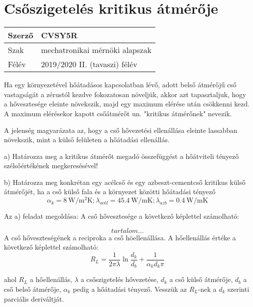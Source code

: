 
\section*{Csőszigetelés kritikus átmérője}


\begin{tabular}{ | p{2cm} | p{14cm} | } 
	\hline
	Szerző & CVSY5R \\ 
	\hline
	Szak & mechatronikai mérnöki alapszak \\ 
	\hline
	Félév & 2019/2020 II. (tavaszi) félév \\ 
	\hline
\end{tabular}
\vspace{0.5cm}

\noindent Ha egy környezetével hőátadásos kapcsolatban lévő, adott belső átmérőjű cső vastagságát a zérustól kezdve fokozatosan növeljük, akkor azt tapasztaljuk, hogy a hővesztesége eleinte növekszik, majd egy maximum elérése után csökkenni kezd. A maximum elérésekor kapott csőátmérőt un. "kritikus átmérőnek" nevezik.

A jelenség magyarázata az, hogy a cső hővezetési ellenállása eleinte lassabban növekszik, mint a külső felületen a hőátadási ellenállás.

a) Határozza meg a kritikus átmérőt megadó összefüggést a hőátviteli tényező szélsőértékének megkeresésével!

b) Határozza meg konkrétan egy acélcső és egy azbeszt-cementcső kritikus külső átmérőjét, ha a cső külső fala és a környezet közötti hőátadási tényező 
\[\alpha_k = \SI{8}{\watt\per\meter\squared\kelvin}; \lambda_{\textit{acél}} = \SI{45,4}{\watt\per\meter\kelvin}; \lambda_{azb} = \SI{0,4}{\watt\per\meter\kelvin}\]

Az a) feladat megoldása:
A cső hővesztesége a következő képlettel számolható: 

\begin{equation}
tartalom...
\end{equation}
A cső hőveszteségének a reciproka a cső höellenállása. A hőellenállás értéke a következő képlettel számolható:
\begin{equation}
	R_L = \frac{1}{2 \pi \lambda}\ln{\frac{d_k}{d_b}}+\frac{1}{\alpha_k d_k \pi} 
\end{equation}


ahol \(R_L\) a hőellenállás, \(\lambda\) a csőszigetelés hővezetése, \(d_k\) a cső külső átmérője, \(d_b\) a cső belső átmérője, \(\alpha_k\) pedig a hőátadási tényező. Vesszük az \(R_L\)-nek a \(d_k\) szerinti parciális deriváltját.

